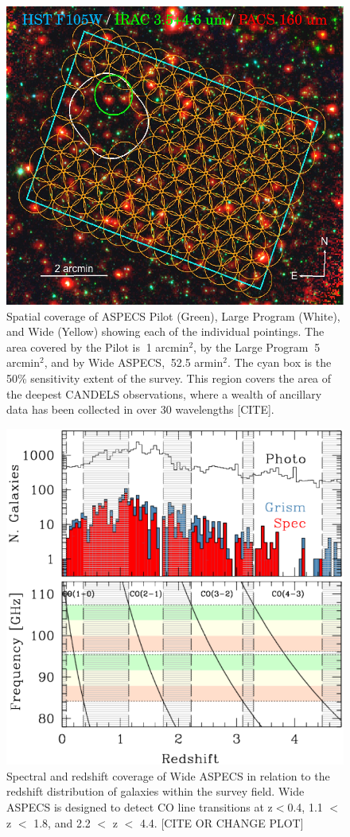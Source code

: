 \begin{figure}[tbp]
\centering \includegraphics[width=120mm]{Wide_ASPECS_Coverage.png}
\caption{Spatial coverage of ASPECS Pilot (Green), Large Program (White), and Wide (Yellow) showing each of the individual pointings. The area covered by the Pilot is $~$1 arcmin$^2$, by the Large Program $~$5 arcmin$^2$, and by Wide ASPECS, $~$52.5 armin$^2$. The cyan box is the 50\% sensitivity extent of the survey. This region covers the area of the deepest CANDELS observations, where a wealth of ancillary data has been collected in over 30 wavelengths [CITE].}
\label{fig:ASPECS_Coverage}
\end{figure}

\begin{figure}[tbp]
\centering
\includegraphics[width=120mm]{Wide_ASPECS_Freq.png}
\caption{Spectral and redshift coverage of Wide ASPECS in relation to the redshift distribution of galaxies within the survey field. Wide ASPECS is designed to detect CO line transitions at z$<$0.4, 1.1 $<$ z $<$ 1.8, and 2.2 $<$ z $<$ 4.4. [CITE OR CHANGE PLOT]}
\label{fig:ASPECS_Freq}
\end{figure}

